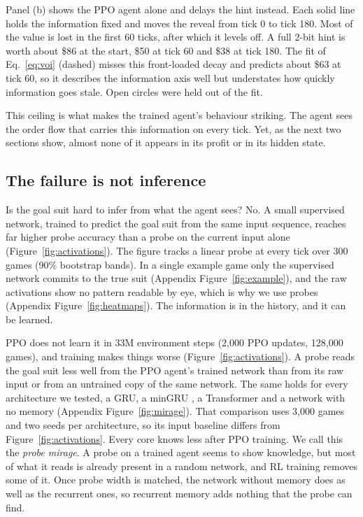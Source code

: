 \documentclass{article}
\begin{document}
Panel (b) shows the PPO agent alone and delays the hint instead. Each solid line holds the information fixed and moves the reveal from tick 0 to tick 180. Most of the value is lost in the first 60 ticks, after which it levels off. A full 2-bit hint is worth about \$86 at the start, \$50 at tick 60 and \$38 at tick 180. The fit of Eq.~\ref{eq:voi} (dashed) misses this front-loaded decay and predicts about \$63 at tick 60, so it describes the information axis well but understates how quickly information goes stale. Open circles were held out of the fit.

This ceiling is what makes the trained agent's behaviour striking. The agent sees the order flow that carries this information on every tick. Yet, as the next two sections show, almost none of it appears in its profit or in its hidden state.


\subsection{The failure is not inference}
\label{sec:inference}

Is the goal suit hard to infer from what the agent sees? No. A small supervised network, trained to predict the goal suit from the same input sequence, reaches far higher probe accuracy than a probe on the current input alone (Figure~\ref{fig:activations}). The figure tracks a linear probe at every tick over 300 games (90\% bootstrap bands). In a single example game only the supervised network commits to the true suit (Appendix Figure~\ref{fig:example}), and the raw activations show no pattern readable by eye, which is why we use probes (Appendix Figure~\ref{fig:heatmaps}). The information is in the history, and it can be learned.

PPO does not learn it in 33M environment steps (2,000 PPO updates, 128,000 games), and training makes things worse (Figure~\ref{fig:activations}). A probe reads the goal suit less well from the PPO agent's trained network than from its raw input or from an untrained copy of the same network. The same holds for every architecture we tested, a GRU, a minGRU \cite{feng2024mingru}, a Transformer and a network with no memory (Appendix Figure~\ref{fig:mirage}). That comparison uses 3,000 games and two seeds per architecture, so its input baseline differs from Figure~\ref{fig:activations}. Every core knows less after PPO training. We call this the \emph{probe mirage}. A probe on a trained agent seems to show knowledge, but most of what it reads is already present in a random network, and RL training removes some of it. Once probe width is matched, the network without memory does as well as the recurrent ones, so recurrent memory adds nothing that the probe can find.
\end{document}
